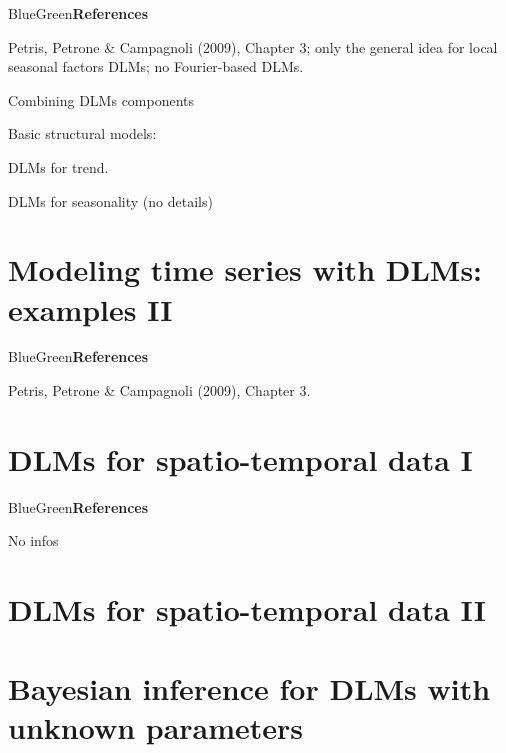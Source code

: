 \documentclass[dvipsnames,12pt]{book}
\begin{document}
        \begin{mybox}{BlueGreen}{\textbf{References}}

            Petris, Petrone \& Campagnoli (2009), Chapter 3; only the general idea for local seasonal factors DLMs; no Fourier-based DLMs.
            
        \end{mybox}

        Combining DLMs components

        Basic structural models:

        DLMs for trend.

        DLMs for seasonality (no details)

    \chapter{Modeling time series with DLMs: examples II}

        \begin{mybox}{BlueGreen}{\textbf{References}}

            Petris, Petrone \& Campagnoli (2009), Chapter 3.
            
        \end{mybox}


    \chapter{DLMs for spatio-temporal data I}

        \begin{mybox}{BlueGreen}{\textbf{References}}

            No infos
            
        \end{mybox}

    \chapter{DLMs for spatio-temporal data II}


    \chapter[Bayesian inference for DLMs]{Bayesian inference for DLMs with unknown parameters}
\end{document}
